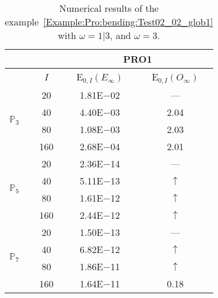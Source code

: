\begin{table}[H]
\caption{Numerical results of the example~\ref{Example:Pro:bending:Test02_02_glob1} with $\omega=1|3$, and $\omega=3$.}
\setlength{\tabcolsep}{5pt}
\centering
\begin{tabular}{@{}l c c c@{}}
\toprule
 &  & \multicolumn{2}{c}{PRO1}\\
\midrule
 & $I$ & E$_{0,I}(E_{\infty})$ & E$_{0,I}(O_{\infty})$\\
\midrule
\multirow{4}{*}{$\mathbb{P}_{3}$} & 20 & 1.81E$-$02 & ---\\
 & 40 & 4.40E$-$03 & 2.04\\
 & 80 & 1.08E$-$03 & 2.03\\
 & 160 & 2.68E$-$04 & 2.01\\
\midrule
\multirow{4}{*}{$\mathbb{P}_{5}$} & 20 & 2.36E$-$14 & ---\\
 & 40 & 5.11E$-$13 & $\uparrow$\\
 & 80 & 1.61E$-$12 & $\uparrow$\\
 & 160 & 2.44E$-$12 & $\uparrow$\\
\midrule
\multirow{4}{*}{$\mathbb{P}_{7}$} & 20 & 1.50E$-$13 & ---\\
 & 40 & 6.82E$-$12 & $\uparrow$\\
 & 80 & 1.86E$-$11 & $\uparrow$\\
 & 160 & 1.64E$-$11 & 0.18\\
\bottomrule
\end{tabular}
\label{Table:PRO:test_02_02_test11}
\end{table}
